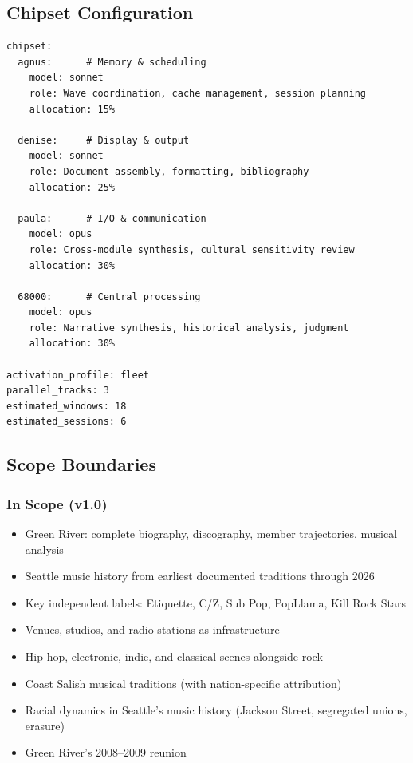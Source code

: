 \documentclass[11pt,letterpaper]{article}
\begin{document}
\subsection{Chipset Configuration}

\begin{asciibox}
\begin{verbatim}
chipset:
  agnus:      # Memory & scheduling
    model: sonnet
    role: Wave coordination, cache management, session planning
    allocation: 15%

  denise:     # Display & output
    model: sonnet
    role: Document assembly, formatting, bibliography
    allocation: 25%

  paula:      # I/O & communication
    model: opus
    role: Cross-module synthesis, cultural sensitivity review
    allocation: 30%

  68000:      # Central processing
    model: opus
    role: Narrative synthesis, historical analysis, judgment
    allocation: 30%

activation_profile: fleet
parallel_tracks: 3
estimated_windows: 18
estimated_sessions: 6
\end{verbatim}
\end{asciibox}

\subsection{Scope Boundaries}

\subsubsection{In Scope (v1.0)}
\begin{itemize}[nosep]
  \item Green River: complete biography, discography, member trajectories, musical analysis
  \item Seattle music history from earliest documented traditions through 2026
  \item Key independent labels: Etiquette, C/Z, Sub Pop, PopLlama, Kill Rock Stars
  \item Venues, studios, and radio stations as infrastructure
  \item Hip-hop, electronic, indie, and classical scenes alongside rock
  \item Coast Salish musical traditions (with nation-specific attribution)
  \item Racial dynamics in Seattle's music history (Jackson Street, segregated unions, erasure)
  \item Green River's 2008--2009 reunion
\end{itemize}
\end{document}
